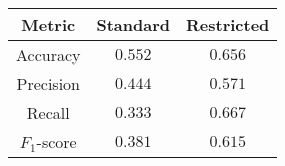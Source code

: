 \begin{tabular}{ccc}
    \textbf{Metric}  & \textbf{Standard} & \textbf{Restricted} \\\hline
    Accuracy         & $0.552$           & $0.656$                \\
    Precision        & $0.444$           & $0.571$                \\
    Recall           & $0.333$           & $0.667$                \\
    $F_1$-score      & $0.381$           & $0.615$
\end{tabular}
